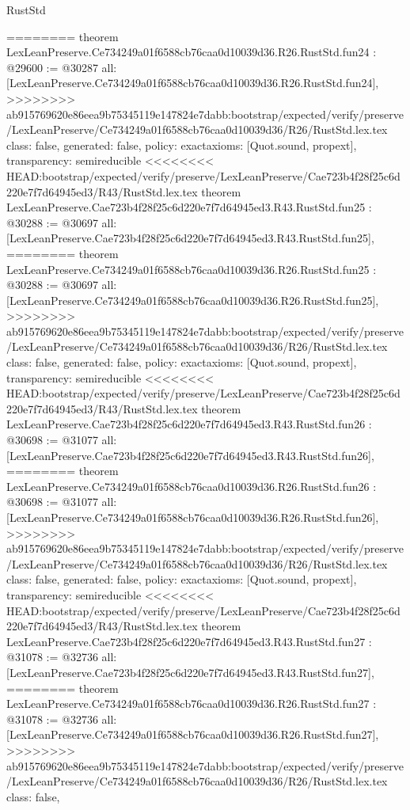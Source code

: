 \begin{lexlean}{RustStd}
\begin{coremodule}
{\begin{coremodule}
{{{{{{{{{{{{{{{{{{{{{{{{{{{========
theorem LexLeanPreserve.Ce734249a01f6588cb76caa0d10039d36.R26.RustStd.fun24 : @29600 := @30287 {
  all: [LexLeanPreserve.Ce734249a01f6588cb76caa0d10039d36.R26.RustStd.fun24],
>>>>>>>> ab915769620e86eea9b75345119e147824e7dabb:bootstrap/expected/verify/preserve/LexLeanPreserve/Ce734249a01f6588cb76caa0d10039d36/R26/RustStd.lex.tex
  class: false,
  generated: false,
  policy: exact{axioms: [Quot.sound, propext]},
  transparency: semireducible
}
<<<<<<<< HEAD:bootstrap/expected/verify/preserve/LexLeanPreserve/Cae723b4f28f25c6d220e7f7d64945ed3/R43/RustStd.lex.tex
theorem LexLeanPreserve.Cae723b4f28f25c6d220e7f7d64945ed3.R43.RustStd.fun25 : @30288 := @30697 {
  all: [LexLeanPreserve.Cae723b4f28f25c6d220e7f7d64945ed3.R43.RustStd.fun25],
========
theorem LexLeanPreserve.Ce734249a01f6588cb76caa0d10039d36.R26.RustStd.fun25 : @30288 := @30697 {
  all: [LexLeanPreserve.Ce734249a01f6588cb76caa0d10039d36.R26.RustStd.fun25],
>>>>>>>> ab915769620e86eea9b75345119e147824e7dabb:bootstrap/expected/verify/preserve/LexLeanPreserve/Ce734249a01f6588cb76caa0d10039d36/R26/RustStd.lex.tex
  class: false,
  generated: false,
  policy: exact{axioms: [Quot.sound, propext]},
  transparency: semireducible
}
<<<<<<<< HEAD:bootstrap/expected/verify/preserve/LexLeanPreserve/Cae723b4f28f25c6d220e7f7d64945ed3/R43/RustStd.lex.tex
theorem LexLeanPreserve.Cae723b4f28f25c6d220e7f7d64945ed3.R43.RustStd.fun26 : @30698 := @31077 {
  all: [LexLeanPreserve.Cae723b4f28f25c6d220e7f7d64945ed3.R43.RustStd.fun26],
========
theorem LexLeanPreserve.Ce734249a01f6588cb76caa0d10039d36.R26.RustStd.fun26 : @30698 := @31077 {
  all: [LexLeanPreserve.Ce734249a01f6588cb76caa0d10039d36.R26.RustStd.fun26],
>>>>>>>> ab915769620e86eea9b75345119e147824e7dabb:bootstrap/expected/verify/preserve/LexLeanPreserve/Ce734249a01f6588cb76caa0d10039d36/R26/RustStd.lex.tex
  class: false,
  generated: false,
  policy: exact{axioms: [Quot.sound, propext]},
  transparency: semireducible
}
<<<<<<<< HEAD:bootstrap/expected/verify/preserve/LexLeanPreserve/Cae723b4f28f25c6d220e7f7d64945ed3/R43/RustStd.lex.tex
theorem LexLeanPreserve.Cae723b4f28f25c6d220e7f7d64945ed3.R43.RustStd.fun27 : @31078 := @32736 {
  all: [LexLeanPreserve.Cae723b4f28f25c6d220e7f7d64945ed3.R43.RustStd.fun27],
========
theorem LexLeanPreserve.Ce734249a01f6588cb76caa0d10039d36.R26.RustStd.fun27 : @31078 := @32736 {
  all: [LexLeanPreserve.Ce734249a01f6588cb76caa0d10039d36.R26.RustStd.fun27],
>>>>>>>> ab915769620e86eea9b75345119e147824e7dabb:bootstrap/expected/verify/preserve/LexLeanPreserve/Ce734249a01f6588cb76caa0d10039d36/R26/RustStd.lex.tex
  class: false,
}}}}}}}}}}}}}}}}}}}}}}}}}}}}}}}
\end{coremodule}}
\end{coremodule}
\end{lexlean}
